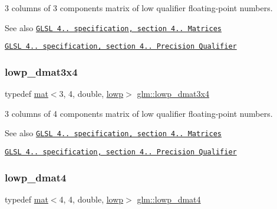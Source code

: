 3 columns of 3 components matrix of low qualifier floating-\/point numbers.

\begin{DoxySeeAlso}{See also}
\href{http://www.opengl.org/registry/doc/GLSLangSpec.4.20.8.pdf}{\tt G\+L\+SL 4.. specification, section 4.. Matrices} 

\href{http://www.opengl.org/registry/doc/GLSLangSpec.4.20.8.pdf}{\tt G\+L\+SL 4.. specification, section 4.. Precision Qualifier} 
\end{DoxySeeAlso}
\mbox{\label{group__core__precision_ga5a806e50b4cb26784620e98c8c03f03b}} 
\subsubsection{\texorpdfstring{lowp\+\_\+dmat3x4}{lowp\_dmat3x4}}
{\footnotesize\ttfamily typedef \mbox{\hyperlink{structglm_1_1mat}{mat}}$<$3, 4, double, \mbox{\hyperlink{namespaceglm_a36ed105b07c7746804d7fdc7cc90ff25ae161af3fc695e696ce3bf69f7332bc2d}{lowp}}$>$ \mbox{\hyperlink{group__core__precision_ga5a806e50b4cb26784620e98c8c03f03b}{glm\+::lowp\+\_\+dmat3x4}}}

3 columns of 4 components matrix of low qualifier floating-\/point numbers.

\begin{DoxySeeAlso}{See also}
\href{http://www.opengl.org/registry/doc/GLSLangSpec.4.20.8.pdf}{\tt G\+L\+SL 4.. specification, section 4.. Matrices} 

\href{http://www.opengl.org/registry/doc/GLSLangSpec.4.20.8.pdf}{\tt G\+L\+SL 4.. specification, section 4.. Precision Qualifier} 
\end{DoxySeeAlso}
\mbox{\label{group__core__precision_ga608895f4a515c7ac6cf3a1c2f11e13cc}} 
\subsubsection{\texorpdfstring{lowp\+\_\+dmat4}{lowp\_dmat4}}
{\footnotesize\ttfamily typedef \mbox{\hyperlink{structglm_1_1mat}{mat}}$<$4, 4, double, \mbox{\hyperlink{namespaceglm_a36ed105b07c7746804d7fdc7cc90ff25ae161af3fc695e696ce3bf69f7332bc2d}{lowp}}$>$ \mbox{\hyperlink{group__core__precision_ga608895f4a515c7ac6cf3a1c2f11e13cc}{glm\+::lowp\+\_\+dmat4}}}


